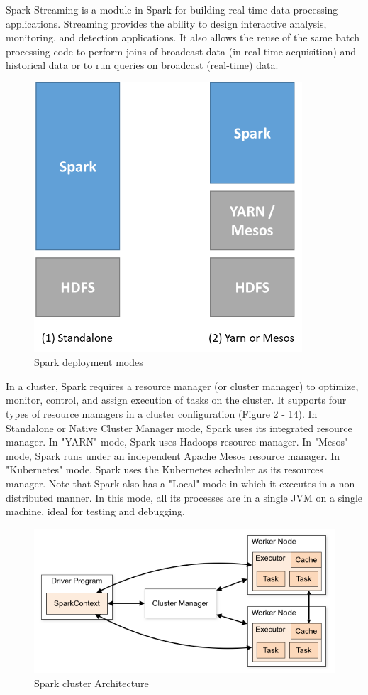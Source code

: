 \documentclass[12pt,english]{book}
\begin{document}
Spark Streaming is a module in Spark for building real-time data processing applications.
Streaming provides the ability to design interactive analysis, monitoring, and detection applications.
It also allows the reuse of the same batch processing code to perform joins of broadcast data (in real-time acquisition) and historical data or to run queries on broadcast (real-time) data.

\begin{figure}[h]
	\centering
	\includegraphics[width=10cm]{sparkConfig}
	\caption{Spark deployment modes}
\end{figure}

In a cluster, Spark requires a resource manager (or cluster manager) to optimize, monitor, control, and assign execution of tasks on the cluster.
It supports four types of resource managers in a cluster configuration (Figure 2 - 14).
In Standalone or Native Cluster Manager mode, Spark uses its integrated resource manager.
In "YARN" mode, Spark uses Hadoops resource manager.
In "Mesos" mode, Spark runs under an independent Apache Mesos resource manager.
In "Kubernetes" mode, Spark uses the Kubernetes scheduler as its resources manager.
Note that Spark also has a "Local" mode in which it executes in a non-distributed manner.
In this mode, all its processes are in a single JVM on a single machine, ideal for testing and debugging.

\begin{figure}[h]
	\centering
	\includegraphics[width=\linewidth]{sparkArch}
	\caption[Spark cluster Architecture]{Spark cluster Architecture \footnotemark}
	\label{fig:sparkClusterArchitecture}
\end{figure}
\end{document}
